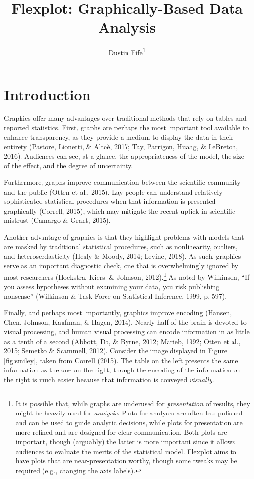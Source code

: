 \documentclass[
  man]{apa6}
\affiliation{
\vspace{0.5cm}
\textsuperscript{1} Rowan University}
\title{Flexplot: Graphically-Based Data Analysis}
\author{Dustin Fife\textsuperscript{1}}
\date{}
\begin{document}
\maketitle

\hypertarget{introduction}{%
\section{Introduction}\label{introduction}}

Graphics offer many advantages over traditional methods that rely on tables and reported statistics. First, graphs are perhaps the most important tool available to enhance transparency, as they provide a medium to display the data in their entirety (Pastore, Lionetti, \& Altoè, 2017; Tay, Parrigon, Huang, \& LeBreton, 2016). Audiences can see, at a glance, the appropriateness of the model, the size of the effect, and the degree of uncertainty.

Furthermore, graphs improve communication between the scientific community and the public (Otten et al., 2015). Lay people can understand relatively sophisticated statistical procedures when that information is presented graphically (Correll, 2015), which may mitigate the recent uptick in scientific mistrust (Camargo \& Grant, 2015).

Another advantage of graphics is that they highlight problems with models that are masked by traditional statistical procedures, such as nonlinearity, outliers, and heteroscedasticity (Healy \& Moody, 2014; Levine, 2018). As such, graphics serve as an important diagnostic check, one that is overwhelmingly ignored by most researchers (Hoekstra, Kiers, \& Johnson, 2012).\footnote{It is possible that, while graphs are underused for \emph{presentation} of results, they might be heavily used for \emph{analysis}. Plots for analyses are often less polished and can be used to guide analytic decisions, while plots for presentation are more refined and are designed for clear communication. Both plots are important, though (arguably) the latter is more important since it allows audiences to evaluate the merits of the statistical model. Flexplot aims to have plots that are near-presentation worthy, though some tweaks may be required (e.g., changing the axis labels).} As noted by Wilkinson, ``If you assess hypotheses without examining your data, you risk publishing nonsense'' (Wilkinson \& Task Force on Statistical Inference, 1999, p. 597).

Finally, and perhaps most importantly, graphics improve encoding (Hansen, Chen, Johnson, Kaufman, \& Hagen, 2014). Nearly half of the brain is devoted to visual processing, and human visual processing can encode information in as little as a tenth of a second (Abbott, Do, \& Byrne, 2012; Marieb, 1992; Otten et al., 2015; Semetko \& Scammell, 2012). Consider the image displayed in Figure \ref{fig:smiley}, taken from Correll (2015). The table on the left presents the same information as the one on the right, though the encoding of the information on the right is much easier because that information is conveyed \emph{visually.}
\end{document}
